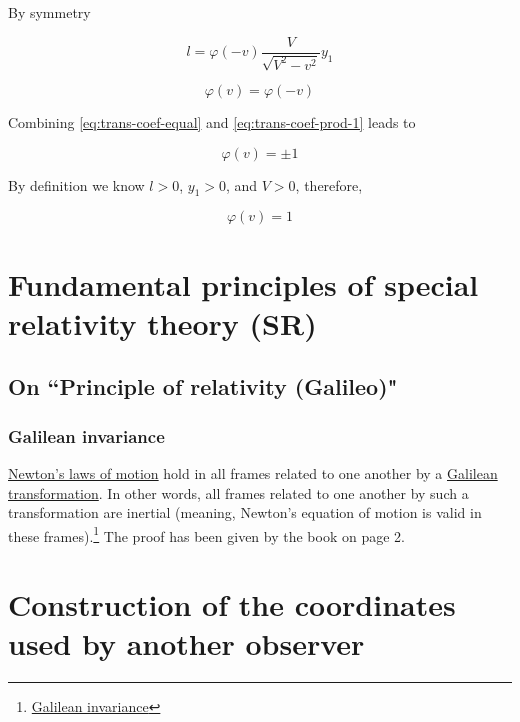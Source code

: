 By symmetry

\begin{equation}
    l = \varphi(-v)\frac{V}{\sqrt{V^2 - v^2}}y_1
\end{equation}

\begin{equation}\label{eq:trans-coef-equal}
    \varphi(v) = \varphi(-v)
\end{equation}

Combining \ref{eq:trans-coef-equal} and \ref{eq:trans-coef-prod-1} leads to

\begin{equation}
    \varphi(v) = \pm 1
\end{equation}

By definition we know $l > 0$, $y_1 > 0$, and $V > 0$, therefore,

\begin{equation}
    \varphi(v) = 1
\end{equation}



\section{Fundamental principles of special relativity theory (SR)}

\subsection{On ``Principle of relativity (Galileo)"}

\subsubsection{Galilean invariance}

\href{https://en.wikipedia.org/wiki/Newton\%27s_laws_of_motion}{Newton's laws of motion} hold in all frames related
to one another by a \href{https://en.wikipedia.org/wiki/Galilean\_transformation}{Galilean transformation}. In
other words, all frames related to one another by such a transformation are inertial (meaning, Newton's equation of
motion is valid in these frames).\footnote{\href{https://en.wikipedia.org/wiki/Galilean_invariance}{Galilean invariance}}
The proof has been given by the book on page 2.

\section{Construction of the coordinates used by another observer}

